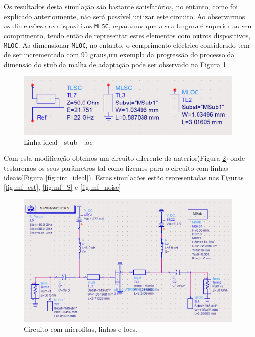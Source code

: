 \documentclass[11pt]{article}
\numberwithin{equation}{section}
\begin{document}
Os resultados desta simulação são bastante satisfatórios, no entanto, como foi explicado anteriormente, não será possível utilizar este circuito. Ao observarmos as dimensões dos dispositivos \texttt{MLSC}, reparamos que a sua largura é superior ao seu comprimento, tendo então de representar estes elementos com outros dispositivos, \texttt{MLOC}. Ao dimensionar \texttt{MLOC}, no entanto, o comprimento eléctrico considerado tem de ser incrementado com 90 graus,um exemplo da progressão do processo da dimensão do stub da malha de adaptação pode ser observado na Figura \ref{fig:stub_fail}.

\begin{figure}[H]
	\centering
	\includegraphics[keepaspectratio=true, scale=0.3]{exps/stub_fail}
	\vspace{-0.5em}
	\caption{Linha ideal - stub - loc}
	\vspace{-0.8em}
	\label{fig:stub_fail}
\end{figure}


Com esta modificação obtemos um circuito diferente do anterior(Figura \ref{fig:circuito_mf}) onde testaremos os seus parâmetros tal como fizemos para o circuito com linhas ideais(Figura \ref{fig:circ_ideal}). Estas simulações estão representadas nas Figuras \ref{fig:mf_est}, \ref{fig:mf_S} e \ref{fig:mf_noise}

\begin{figure}[H]
	\centering
	\includegraphics[keepaspectratio=true, scale=0.45]{exps/Circuito_mf}
	\vspace{-0.5em}
	\caption{Circuito com microfitas, linhas e locs.}
	\vspace{-0.8em}
	\label{fig:circuito_mf}
\end{figure}
\end{document}
